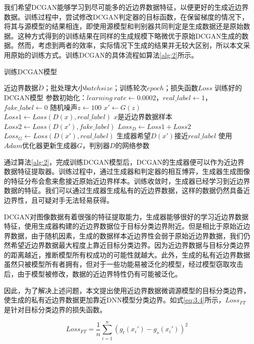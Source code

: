 我们希望DCGAN能够学习到尽可能多的近边界数据特征，以便更好的生成近边界数据。训练过程中，尝试修改DCGAN判定器的目标函数，在保留梯度的情况下，将其与源模型的结果相连，即使用源模型和判别器共同判定是生成数据还是原始数据。这种方式得到的训练结果在同样的生成规模下略微优于原始DCGAN生成的数据。然而，考虑到两者的效率，实际情况下生成的结果并无较大区别，所以本文采用原始的训练方式。训练DCGAN的具体流程如算法\ref{alg:2}所示。

\begin{algorithm}[!h] 
	\caption{训练DCGAN模型}
	\label{alg:2}
	\begin{algorithmic}[1]
		
		\Require 近边界数据$\tilde{D}$；批处理大小$batchsize$；训练轮次$epoch$；损失函数$Loss$
		\Ensure 训练好的DCGAN模型
		\State 参数初始化：$learning \ rate \gets 0.0002$，$real\_label \gets 1$，$fake\_label \gets 0$
		\State 随机噪声$z \gets 100$ 
		\State $x' \gets G(z)$
		\State $Loss1 \gets Loss(D(x), real\_label)$  \Comment $x$是近边界数据样本
		\State $Loss2 \gets Loss(D(x'), fake\_label)$
		\State $Loss_D \gets Loss1 + Loss2$
		\State $Loss_G \gets Loss(D(x'), real\_label)$ \Comment 生成器希望$D(x') $接近$real\_label$
		\State 使用$Adam$优化器更新生成器$G$，判别器$D$的网络参数
		\EndFor
	\end{algorithmic}
\end{algorithm}

通过算法\ref{alg:2}，完成训练DCGAN模型后，DCGAN的生成器便可以作为近边界数据特征提取器。训练过程中，通过生成器和判定器的相互博弈，生成器生成图像的特征分布会愈来愈接近原始近边界样本。训练收敛时，生成器已经学习到近边界数据的特征。我们可以通过生成器生成私有的近边界数据，这样的数据仍然具备近边界性，且可疑对手无法轻易获得。

DCGAN对图像数据有着很强的特征提取能力，生成器能够很好的学习近边界数据特征，使用生成器构建的近边界数据位于目标分类边界附近。但是相比于原始近边界数据，由于随机因素，生成的数据样本近边界性会弱于原始近边界数据，我们仍然希望近边界数据最大程度上靠近目标分类边界。因为近边界数据与目标分类边界的距离越近，推断模型所有权成功的可能性就越大。此外，生成的私有近边界数据虽然只被模型所有者拥有，但对于一些功能易被泛化的模型，经过模型窃取攻击后，由于模型被修改，数据的近边界特性仍有可能被泛化。

因此，为了解决上述问题，本文提出使用近边界数据微调源模型的目标分类边界，使生成的私有近边界数据更加靠近DNN模型分类边界。如式\ref{eq:3.4}所示，$Loss_{FT}$是针对目标分类边界的损失函数。

\begin{equation}
	\label{eq:3.10}
	Loss_{FT} = \frac{1}{n} \sum^{n}_{i = 1} (g_t(x_i') - g_s(x_i'))^2
\end{equation}


